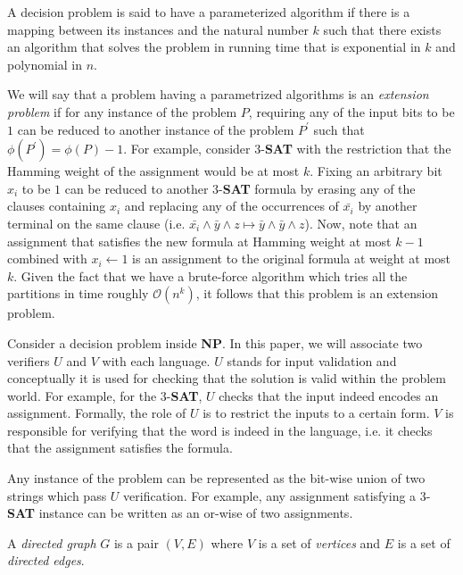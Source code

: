 \documentclass[manuscript,screen,review]{acmart}
\begin{document}
A decision problem is said to have a parameterized algorithm if there is a mapping between its instances and the natural number $k$ such that there exists an algorithm that solves the problem in running time that is exponential in $k$ and polynomial in $n$. 

We will say that a problem having a parametrized algorithms is an \emph{extension problem} if for any instance of the problem $P$, requiring any of the input bits to be $1$ can be reduced to another instance of the problem $P^{\prime}$ such that $\phi\left( P^{\prime} \right) = \phi\left( P \right) - 1$. For example, consider $3$-\textbf{SAT} with the restriction that the Hamming weight of the assignment would be at most $k$. Fixing an arbitrary bit $x_{i}$ to be $1$ can be reduced to another $3$-\textbf{SAT} formula by erasing any of the clauses containing $x_{i}$ and replacing any of the occurrences of $\bar{x_{i}}$ by another terminal on the same clause (i.e. $ \bar{x_{i}} \wedge  \bar{y} \wedge z  \mapsto  \bar{y} \wedge \bar{y} \wedge z$). Now, note that an assignment that satisfies the new formula at Hamming weight at most $k-1$ combined with $x_{i} \leftarrow 1$ is an assignment to the original formula at weight at most $k$. Given the fact that we have a brute-force algorithm which tries all the partitions in time roughly $\mathcal{O}\left( n^{k} \right)$, it follows that this problem is an extension problem.

Consider a decision problem inside \textbf{NP}. In this paper, we will associate two verifiers $U$ and $V$ with each language. $U$ stands for input validation and conceptually it is used for checking that the solution is valid within the problem world. For example, for the $3$-\textbf{SAT}, $U$ checks that the input indeed encodes an assignment. Formally, the role of $U$ is to restrict the inputs to a certain form. $V$ is responsible for verifying that the word is indeed in the language, i.e. it checks that the assignment satisfies the formula.


Any instance of the problem can be represented as the bit-wise union of two strings which pass $U$ verification. For example, any assignment satisfying a  $3$-\textbf{SAT} instance can be written as an or-wise of two assignments.

\begin{definition}
A \emph{directed graph} $G$ is a pair $(V,E)$ where $V$ is a set of \emph{vertices} and $E$ is a set of \emph{directed edges}.
\end{definition}
\end{document}
